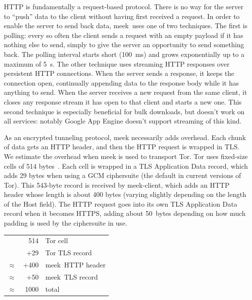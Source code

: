 \documentclass[conference]{IEEEtran}
\newcommand{\meekclient}{\mbox{meek-client}\xspace}
\newcommand{\meek}{meek\xspace}
\begin{document}
HTTP is fundamentally a request-based protocol.
There is no way for the server to ``push'' data to the client without
having first received a request.
In order to enable the server to send back data,
\meek\ uses one of two techniques.
The first is polling:
every so often the client sends a request with an empty payload
if it has nothing else to send,
simply to give the server an opportunity to send something back.
The polling interval starts short (100~ms) and grows exponentially
up to a maximum of 5~s.
The other technique
uses streaming HTTP responses over persistent HTTP connections.
When the server sends a response, it keeps the connection open,
continually appending data to the response body while it has anything to send.
When the server receives a new request from the same client,
it closes any response stream it has open to that client and starts a new one.
This second technique is especially beneficial for bulk downloads,
but doesn't work on all services:
notably Google App Engine doesn't support streaming of this kind.

As an encrypted tunneling protocol, meek necessarily adds overhead.
Each chunk of data gets an HTTP header, and then the HTTP
request is wrapped in TLS.
We estimate the overhead when meek is used to transport Tor.
Tor uses fixed-size cells of 514 bytes~\cite[Section~0.2]{tor-spec}.
Each cell is wrapped in a TLS Application Data record, which adds 29 bytes
when using a GCM ciphersuite (the default in current versions of Tor).
This 543-byte record is received by \meekclient,
which adds an HTTP header whose length is about 400 bytes
(varying slightly depending on the length of the Host field).
The HTTP request goes into its own TLS Application Data record when it becomes HTTPS,
adding about 50~bytes
depending on how much padding is used by the ciphersuite in use.


\begin{center}
\begin{tabular}{r@{}r l}
          &    514 & Tor cell \\
          &  $+$29 & Tor TLS record \\
$\approx$ & $+$400 & \meek\ HTTP header \\
$\approx$ &  $+$50 & \meek\ TLS record \\
\hline
$\approx$ &   1000 & total
\end{tabular}
\end{center}
\end{document}
